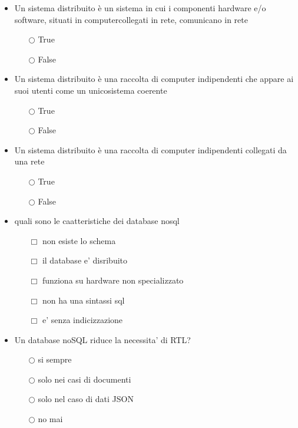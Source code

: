 \documentclass[10pt,twocolumn]{article}
\begin{document}
\begin{itemize}
    \item Un sistema distribuito è un sistema in cui i componenti hardware e/o software, situati in computercollegati in rete, comunicano in rete
          \begin{itemize}
              \item[$\bigcirc$] True
              \item[$\bigcirc$] False
          \end{itemize}
\end{itemize}
\begin{itemize}
    \item Un sistema distribuito è una raccolta di computer indipendenti che appare ai suoi utenti come un unicosistema coerente
          \begin{itemize}
              \item[$\bigcirc$] True
              \item[$\bigcirc$] False
          \end{itemize}
\end{itemize}
\begin{itemize}
    \item Un sistema distribuito è una raccolta di computer indipendenti collegati da una rete
          \begin{itemize}
              \item[$\bigcirc$] True
              \item[$\bigcirc$] False
          \end{itemize}
\end{itemize}
\begin{itemize}
    \item quali sono le caatteristiche dei database nosql
          \begin{itemize}
              \item[$\Box$] non esiste lo schema
              \item[$\Box$] il database e' disribuito
              \item[$\Box$] funziona su hardware non specializzato
              \item[$\Box$] non ha una sintassi sql
              \item[$\Box$] e' senza indicizzazione
          \end{itemize}
\end{itemize}
\begin{itemize}
    \item Un database noSQL riduce la necessita' di RTL?
          \begin{itemize}
              \item[$\bigcirc$] si sempre
              \item[$\bigcirc$] solo nei casi di documenti
              \item[$\bigcirc$] solo nel caso di dati JSON
              \item[$\bigcirc$] no mai
          \end{itemize}
\end{itemize}
\end{document}
